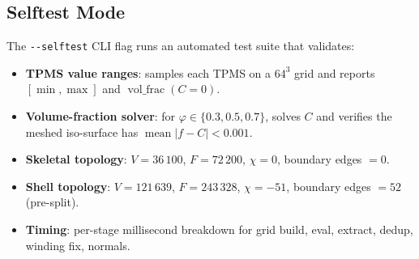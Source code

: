 \documentclass[11pt]{article}
\begin{document}
\subsection{Selftest Mode}\label{sec:selftest}

The \texttt{-{}-selftest} CLI flag runs an automated test suite that
validates:
\begin{itemize}
  \item \textbf{TPMS value ranges}: samples each TPMS on a $64^3$
        grid and reports $[\min, \max]$ and $\operatorname{vol\_frac}(C=0)$.
  \item \textbf{Volume-fraction solver}: for $\varphi \in \{0.3, 0.5, 0.7\}$,
        solves $C$ and verifies the meshed iso-surface has
        $\operatorname{mean}|f-C| < 0.001$.
  \item \textbf{Skeletal topology}: $V=36\,100$, $F=72\,200$,
        $\chi=0$, boundary edges $=0$.
  \item \textbf{Shell topology}: $V=121\,639$, $F=243\,328$,
        $\chi=-51$, boundary edges $=52$ (pre-split).
  \item \textbf{Timing}: per-stage millisecond breakdown for
        grid build, eval, extract, dedup, winding fix, normals.
\end{itemize}
\end{document}

